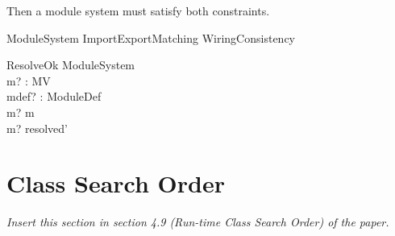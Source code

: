 \documentclass[a4paper,9pt]{article}
\begin{document}
Then a module system must satisfy both constraints.
\begin{zed}
  ModuleSystem  ImportExportMatching \land WiringConsistency
\end{zed}

\begin{schema}{ResolveOk}
 \Delta ModuleSystem \\
 m? : MV \\
 mdef? : ModuleDef \\
\where
 m? \notin \dom m \\
 m? \in resolved' \\
\end{schema}

\clearpage
\section{Class Search Order}
\label{cha:classsearchorder}
\textit{Insert this section in section 4.9 (Run-time Class Search Order)
of the paper.}
\end{document}
